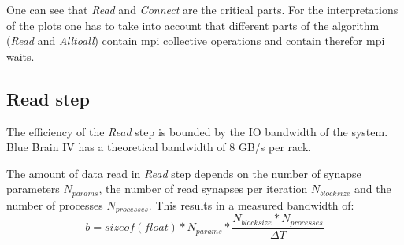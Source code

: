 One can see that \emph{Read} and \emph{Connect} are the critical parts.
For the interpretations of the plots one has to take into account that different parts of the algorithm
(\emph{Read} and \emph{Alltoall}) contain mpi collective operations and contain therefor mpi waits.

\subsection{Read step}
\label{sec:speedup:load}
The efficiency of the \emph{Read} step is bounded by the IO bandwidth of the system.
Blue Brain IV has a theoretical bandwidth of $8$ GB/s per rack.

The amount of data read in \emph{Read} step depends on the number of synapse parameters $N_{params}$,
the number of read synapses per iteration $N_{blocksize}$ and the number of processes $N_{processes}$.
This results in a measured bandwidth of:
\begin{equation}
b = sizeof(float) * N_{params} * \frac{N_{blocksize} * N_{processes}}{\Delta T}
\end{equation}

